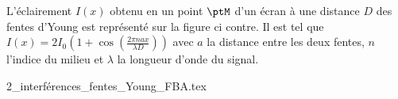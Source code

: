 



\hauteurLargeurCadreReponse		{6mm}{5cm}
\initialisationEntrainement

                                \initialisationPartieGauche %
L'éclairement $I(x)$ obtenu en un point $\ptM$ d'un écran à une distance $D$ des fentes d'Young est représenté sur la figure ci contre. Il est tel que $I(x)=2I_0 \left(1+\cos\left(\frac{2\pi nax}{\lambda D}\right)\right)$ avec $a$ la distance entre les deux fentes, $n$ l'indice du milieu et $\lambda$ la longueur d'onde du signal.

                                \initialisationPartieDroite %
\begin{center}
	{2_interférences_fentes_Young_FBA.tex}
\end{center}
                               \finalisationDuPartageDePage %




